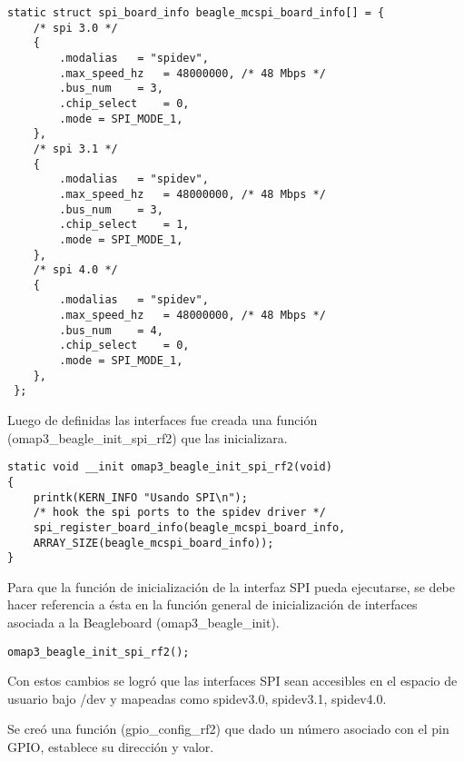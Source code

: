 \begin{verbatim}
static struct spi_board_info beagle_mcspi_board_info[] = { 
    /* spi 3.0 */ 
    { 
        .modalias	= "spidev", 
        .max_speed_hz	= 48000000, /* 48 Mbps */ 
        .bus_num	= 3, 
        .chip_select	= 0,	 
        .mode = SPI_MODE_1, 
    }, 
    /* spi 3.1 */ 
    { 
        .modalias	= "spidev", 
        .max_speed_hz	= 48000000, /* 48 Mbps */ 
        .bus_num	= 3, 
        .chip_select	= 1,	 
        .mode = SPI_MODE_1, 
    }, 
    /* spi 4.0 */ 
    { 
        .modalias	= "spidev", 
        .max_speed_hz	= 48000000, /* 48 Mbps */ 
        .bus_num	= 4, 
        .chip_select	= 0,	 
        .mode = SPI_MODE_1, 
    }, 
 }; 
\end{verbatim}

Luego de definidas las interfaces fue creada una función (omap3\_beagle\_init\_spi\_rf2) que las inicializara.

\begin{verbatim}
static void __init omap3_beagle_init_spi_rf2(void) 
{ 
    printk(KERN_INFO "Usando SPI\n");  
    /* hook the spi ports to the spidev driver */ 
    spi_register_board_info(beagle_mcspi_board_info, 
    ARRAY_SIZE(beagle_mcspi_board_info)); 
}
\end{verbatim}

Para que la función de inicialización de la interfaz SPI pueda ejecutarse, se debe hacer referencia a ésta en la función general de inicialización de interfaces asociada a la Beagleboard (omap3\_beagle\_init).

\begin{verbatim}
omap3_beagle_init_spi_rf2();
\end{verbatim}

Con estos cambios se logró que las interfaces SPI sean accesibles en el espacio de usuario bajo /dev y mapeadas como spidev3.0, spidev3.1, spidev4.0.

\newpage
{}

\bigskip
Se creó una función (gpio\_config\_rf2) que dado un número asociado con el pin GPIO, establece su dirección y valor.


